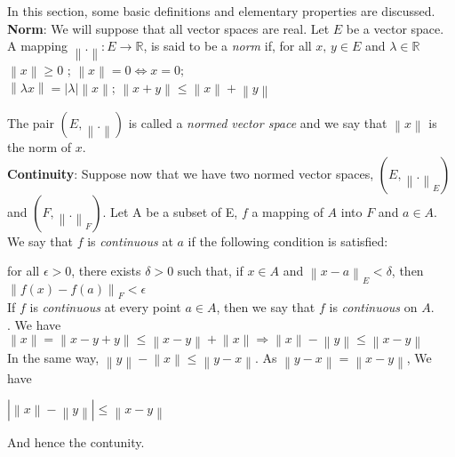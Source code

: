 \documentclass[11 pt]{article}
\theoremstyle{definition}
\theoremstyle{remark}
\newcommand\norm[1]{\left\lVert#1\right\rVert}
\begin{document}
In this section, some basic definitions and elementary properties are discussed.\\

\textbf{Norm}:
We will suppose that all vector spaces are real. Let $E$ be a vector space. A mapping $ \norm{.}: E\rightarrow \mathbb{R} $, is said to be a \textit{norm} if, for all $\textit{x, y} \in E$ and $\lambda \in \mathbb{R}$ \\

 $\norm{x}\geq 0$ ; $\norm{x} = 0 \Leftrightarrow x = 0;$ \\
 $\norm{\lambda x} = |\lambda|\norm{x}$; $\norm{x + y} \leq \norm{x} + \norm{y}$
 
The pair $(E, \norm{.})$ is called a \textit{normed vector space} and we say that $\norm{x}$ is the norm
of $x$.\\

\textbf{Continuity}: Suppose now that we have two normed vector spaces, $(E, \norm{.}_{E})$ and $(F, \norm{.}_{F})$. Let A be a subset of E, $ f $ a mapping of $A$ into $F$ and $a \in A$. We say that $f$ is \textit{continuous} at $a$ if the following condition is satisfied: \par
for all $\epsilon > 0$, there exists $\delta > 0$ such that, if $x \in A$ and $\norm{x-a}_{E} < \delta$,
then $\norm{f(x) - f(a)}_{F} < \epsilon$ \\
If $f$ is \textit{continuous} at every point $a \in A$, then we say that $f$ is \textit{continuous} on $A$.\\

.
\proof We have 
$\norm{x} = \norm{x-y+y} \leq \norm{x-y} + \norm{x} \Rightarrow \norm{x} - \norm{y} \leq \norm{x-y}$\\
In the same way,  $\norm{y} - \norm{x} \leq \norm{y-x}.$ As $\norm{y-x} = \norm{x-y}$, We have
\begin{center}
$|\norm{x}-\norm{y}| \leq \norm{x-y}$
\end{center} 
And hence the contunity.\\
\end{document}
